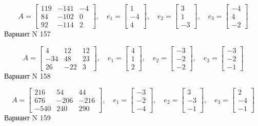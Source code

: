 \documentclass[11pt]{report}
\begin{document}
$$A = \left[\begin{matrix}119 & -141 & -4\\84 & -102 & 0\\92 & -114 & 2\end{matrix}\right],\quad e_1 = \left[\begin{matrix}1\\-4\\4\end{matrix}\right],\quad e_2 = \left[\begin{matrix}3\\1\\-3\end{matrix}\right],\quad e_3 = \left[\begin{matrix}-4\\4\\-2\end{matrix}\right]$$Вариант N 157

$$A = \left[\begin{matrix}4 & 12 & 12\\-34 & 48 & 23\\26 & -22 & 3\end{matrix}\right],\quad e_1 = \left[\begin{matrix}4\\1\\2\end{matrix}\right],\quad e_2 = \left[\begin{matrix}-3\\-2\\-2\end{matrix}\right],\quad e_3 = \left[\begin{matrix}-3\\-2\\-1\end{matrix}\right]$$Вариант N 158

$$A = \left[\begin{matrix}216 & 54 & 44\\676 & -206 & -216\\-540 & 240 & 290\end{matrix}\right],\quad e_1 = \left[\begin{matrix}-3\\-2\\-4\end{matrix}\right],\quad e_2 = \left[\begin{matrix}3\\-3\\-1\end{matrix}\right],\quad e_3 = \left[\begin{matrix}2\\-4\\-1\end{matrix}\right]$$Вариант N 159
\end{document}
